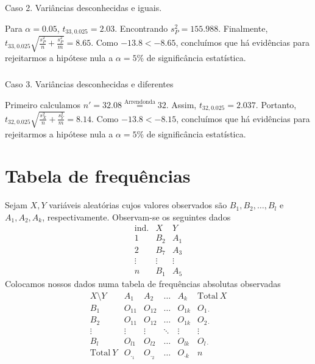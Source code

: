 \documentclass[
  letterpaper,
  DIV=11,
  numbers=noendperiod]{scrreprt}
\makeatletter
\let\oldparagraph\paragraph
\renewcommand{\paragraph}{
    \@ifstar
      \xxxParagraphStar
      \xxxParagraphNoStar
  }
\newcommand{\xxxParagraphStar}[1]{\oldparagraph*{#1}\mbox{}}
\newcommand{\xxxParagraphNoStar}[1]{\oldparagraph{#1}\mbox{}}
\makeatother
\begin{document}
\paragraph{Caso 2. Variâncias desconhecidas e
iguais.}\label{caso-2.-variuxe2ncias-desconhecidas-e-iguais.}

Para \(\alpha=0.05\), \(t_{33,0.025}=2.03\). Encontrando
\(s^2_{P} = 155.988\). Finalmente, \(t_{33,0.025}
\sqrt{  \frac{s^2_{P}}{n} + \frac{s^2_{P}}{m} }=8.65\). Como
\(-13.8 < -8.65\), concluímos que há evidências para rejeitarmos a
hipótese nula a \(\alpha=5\%\) de significância estatística.

\paragraph{Caso 3. Variâncias desconhecidas e
diferentes}\label{caso-3.-variuxe2ncias-desconhecidas-e-diferentes}

Primeiro calculamos \(n'= 32.08 \stackrel{\text{Arrendonda}}{=}32\).
Assim, \(t_{32,0.025} = 2.037\). Portanto,
\(t_{32,0.025} \sqrt{  \frac{s^2_{X}}{n} + \frac{s^2_{Y}}{m} }=8.14\).
Como \(-13.8 < -8.15\), concluímos que há evidências para rejeitarmos a
hipótese nula a \(\alpha=5\%\) de significância estatística.


\chapter{Tabela de frequências}\label{tabela-de-frequuxeancias}

Sejam \(X,Y\) variáveis aleatórias cujos valores observados são
\(B_{1},B_{2},\dots,B_{l}\) e \(A_{1},A_{2}, A_{k}\), respectivamente.
Observam-se os seguintes dados \[
\begin{array}{ccc}
\mathrm{ind.}  & X & Y \\
1  & B_{2} & A_{1} \\
2 & B_{7} & A_{3} \\
\vdots & \vdots  & \vdots \\
n  & B_{1} & A_{5}
\end{array}
\] Colocamos nossos dados numa tabela de frequências absolutas
observadas \[
\begin{array}{c|cccc|c}
X\setminus Y  & A_{1} & A_{2} & \dots & A_{k} & \mathrm{Total}~X \\
\hline
B_{1} & O_{11} & O_{12} & \dots & O_{1k} & O_{1\cdot} \\
B_{2} & O_{11} & O_{12} & \dots & O_{1k} & O_{2\cdot} \\
\vdots & \vdots & \vdots & \ddots & \vdots & \vdots \\
B_{l} & O_{l1} & O_{l2} & \dots & O_{lk} & O_{l\cdot} \\
\hline
\mathrm{Total}~Y  & O_{\cdot_{1}} & O_{\cdot_{2}}  & \dots  & O_{\cdot k}  & n
\end{array}
\]
\end{document}
